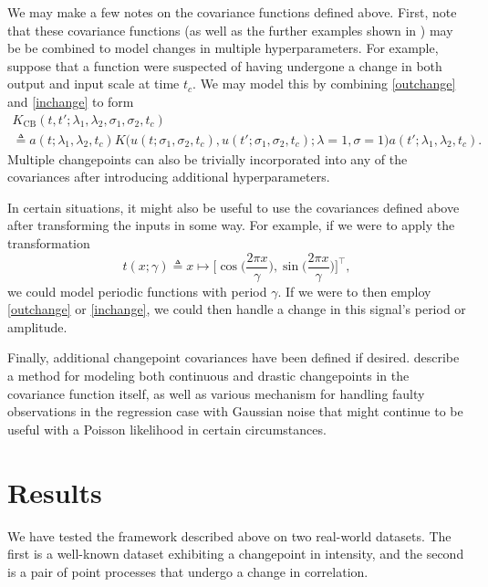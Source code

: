 \documentclass{article}
\newcommand{\deq}{\triangleq}
\begin{document}
We may make a few notes on the covariance functions defined above.
First, note that these covariance functions (as well as the further
examples shown in \citep{cpcj, thesis}) may be be combined to model
changes in multiple hyperparameters.  For example, suppose that
a function were suspected of having undergone a change in both 
output and input scale at time $t_c$.  We may model this by combining
\eqref{outchange} and \eqref{inchange} to form
\begin{multline}
  \label{bothchange}
  K_{\text{CB}}
  (t, t'; \lambda_1, \lambda_2, \sigma_1, \sigma_2, t_c)
  \\
  \deq
  a(t; \lambda_1, \lambda_2, t_c)
  K
  \bigl(
    u(t; \sigma_1, \sigma_2, t_c),
    u(t'; \sigma_1, \sigma_2, t_c)
    ;
    \lambda = 1, \sigma = 1
  \bigr)
  a(t'; \lambda_1, \lambda_2, t_c).
\end{multline}
Multiple changepoints can also be trivially incorporated into any of
the covariances after introducing additional hyperparameters.

In certain situations, it might also be useful to use the covariances
defined above after transforming the inputs in some way.  For example,
if we were to apply the transformation
\begin{equation*}
  t(x; \gamma) 
  \deq 
  x 
  \mapsto 
  \Biggl[ 
    \cos \biggl( \frac{2 \pi x}{\gamma} \biggr),
    \sin \biggl( \frac{2 \pi x}{\gamma} \biggr)
  \Biggr]^\top,
\end{equation*}
we could model periodic functions with period $\gamma$.  If we were to
then employ \eqref{outchange} or \eqref{inchange}, we could then
handle a change in this signal's period or amplitude.

Finally, additional changepoint covariances have been defined if
desired.  \citet{cpcj} describe a method for modeling both continuous
and drastic changepoints in the covariance function itself, as well as
various mechanism for handling faulty observations in the regression
case with Gaussian noise that might continue to be useful with a
Poisson likelihood in certain circumstances.

\section{Results}
\label{results}

We have tested the framework described above on two real-world
datasets.  The first is a well-known dataset exhibiting a changepoint
in intensity, and the second is a pair of point processes that undergo
a change in correlation.
\end{document}
